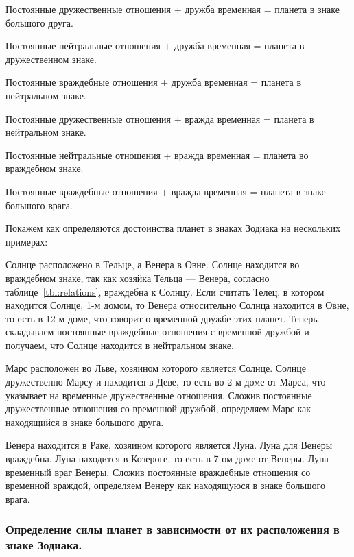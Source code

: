 \begin{myenum}[itemsep=0,parsep=0]
	\item Постоянные дружественные отношения + дружба временная = планета в знаке большого друга.
	\item Постоянные нейтральные отношения + дружба временная = планета в дружественном знаке.
	\item Постоянные враждебные отношения + дружба временная = планета в нейтральном знаке.
	\item Постоянные дружественные отношения + вражда временная = планета в нейтральном знаке.
	\item Постоянные нейтральные отношения + вражда временная = планета во враждебном знаке.
	\item Постоянные враждебные отношения + вражда временная = планета в знаке большого врага. 
\end{myenum}

Покажем как определяются достоинства планет в знаках Зодиака на нескольких примерах:

\begin{myenum}
	\item Солнце расположено в Тельце, а Венера в Овне. Солнце находится во враждебном знаке, так как хозяйка Тельца --- Венера, согласно таблице~\ref{tbl:relations}, враждебна к Солнцу. Если считать Телец, в котором находится Солнце, 1-м домом, то Венера относительно Солнца находится в Овне, то есть в 12-м доме, что говорит о временной дружбе этих планет. Теперь складываем постоянные враждебные отношения с временной дружбой и получаем, что Солнце находится в нейтральном знаке.
	\item Марс расположен во Льве, хозяином которого является Солнце. Солнце дружественно Марсу и находится в Деве, то есть во 2-м доме от Марса, что указывает на временные дружественные отношения. Сложив постоянные дружественные отношения со временной дружбой, определяем Марс как находящийся в знаке большого друга.
	\item Венера находится в Раке, хозяином которого является Луна. Луна для Венеры враждебна. Луна находится в Козероге, то есть в 7-ом доме от Венеры. Луна --- временный враг Венеры. Сложив постоянные враждебные отношения со временной враждой, определяем Венеру как находящуюся в знаке большого врага.
\end{myenum}


\subsubsection*{Определение силы планет в зависимости от их расположения в знаке Зодиака.}

